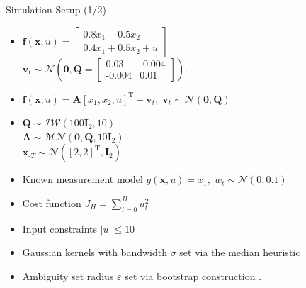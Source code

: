 \documentclass[student, noshadow, itr, english, aspectratio=169]{ITR_LSR_slides}
\begin{document}
\begin{frame}{Simulation Setup (1/2)}
\begin{itemize}
\item 
{}
$\boldsymbol{f}(\boldsymbol{x}, u) = 
\begin{bmatrix}
0.8  x_1 - 0.5 x_2 \\
0.4 x_1 + 0.5 x_2 + u
\end{bmatrix}$ \\
\makebox[4cm]{\hfill} $\boldsymbol{v}_t \sim \mathcal{N} \left(\boldsymbol{0}, \boldsymbol{Q} =  
\begin{bmatrix}
0.03 & \text{-}0.004 \\
\text{-}0.004 & 0.01
\end{bmatrix}
\right).$

\item 
{} $\boldsymbol{f}(\boldsymbol{x}, u) = \boldsymbol{A} \left[ x_1,  x_2,  u \right]^\text{T} + \boldsymbol{v}_{t}, \; \boldsymbol{v}_{t} \sim \mathcal{N} (\boldsymbol{0}, \boldsymbol{Q})$ 
\item
{} $\boldsymbol{Q} \sim \mathcal{IW} (100 \boldsymbol{I}_2, 10)$ \\
\makebox[4.5cm]{\hfill} $\boldsymbol{A} \sim \mathcal{MN} (\boldsymbol{0}, \boldsymbol{Q}, 10 \boldsymbol{I}_2)\;\;\;\;\;\;\;\;\;\;\;\;\;\;\;\;\;\;$ \cite{Svensson_17}\\
\makebox[4.5cm]{\hfill} $\boldsymbol{x}_{\text{-}T} \sim \mathcal{N} ([2, 2]^\text{T}, \boldsymbol{I}_2)$


\item Known measurement model $g(\boldsymbol{x}, u) = x_1, \; w_t \sim \mathcal{N} (0, 0.1)$

\item Cost function $J_H = \sum_{t = 0}^H u_t^2$

\item Input constraints $\left| u \right| \leq 10$

\item Gaussian kernels with bandwidth $\sigma$ set via the median heuristic \cite{Damien_18}

\item Ambiguity set radius $\varepsilon$ set via bootstrap construction \cite{Yassine_22}.
\end{itemize}
\end{frame}	
\end{document}
